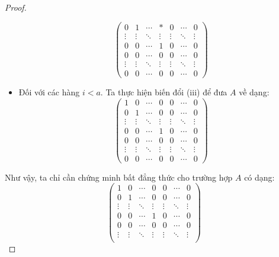 \documentclass[class=nhvh-linear-algebra,crop=false]{standalone}
\begin{document}
\begin{proof}
\begin{itemize}
\[\begin{pmatrix}
				      0      & 1      & \cdots & *      & 0      & \cdots & 0      \\
				      \vdots & \vdots & \ddots & \vdots & \vdots & \ddots & \vdots \\
				      0      & 0      & \cdots & 1      & 0      & \cdots & 0      \\
				      0      & 0      & \cdots & 0      & 0      & \cdots & 0      \\
				      \vdots & \vdots & \ddots & \vdots & \vdots & \ddots & \vdots \\
				      0      & 0      & \cdots & 0      & 0      & \cdots & 0
			      \end{pmatrix}
		      \]
		\item Đối với các hàng $i < a$. Ta thực hiện biến đổi (iii) để đưa $A$ về dạng:
		      \[
			      \begin{pmatrix}
				      1      & 0      & \cdots & 0      & 0      & \cdots & 0      \\
				      0      & 1      & \cdots & 0      & 0      & \cdots & 0      \\
				      \vdots & \vdots & \ddots & \vdots & \vdots & \ddots & \vdots \\
				      0      & 0      & \cdots & 1      & 0      & \cdots & 0      \\
				      0      & 0      & \cdots & 0      & 0      & \cdots & 0      \\
				      \vdots & \vdots & \ddots & \vdots & \vdots & \ddots & \vdots \\
				      0      & 0      & \cdots & 0      & 0      & \cdots & 0
			      \end{pmatrix}
		      \]
	\end{itemize}
	\par Như vậy, ta chỉ cần chứng minh bất đẳng thức cho trường hợp $A$ có dạng:
	\[
		\begin{pmatrix}
			1      & 0      & \cdots & 0      & 0      & \cdots & 0      \\
			0      & 1      & \cdots & 0      & 0      & \cdots & 0      \\
			\vdots & \vdots & \ddots & \vdots & \vdots & \ddots & \vdots \\
			0      & 0      & \cdots & 1      & 0      & \cdots & 0      \\
			0      & 0      & \cdots & 0      & 0      & \cdots & 0      \\
			\vdots & \vdots & \ddots & \vdots & \vdots & \ddots & \vdots \\

\end{pmatrix}\]
\end{proof}
\end{document}
